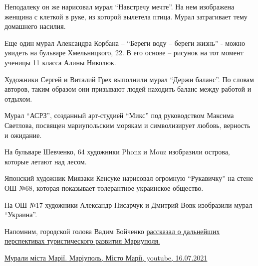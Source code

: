 
Неподалеку он же нарисовал мурал \enquote{Навстречу мечте}. На нем изображена женщина с
клеткой в руке, из которой вылетела птица. Мурал затрагивает тему домашнего
насилия.


Еще один мурал Александра Корбана – \enquote{Береги воду – береги жизнь} - можно
увидеть на бульваре Хмельницкого, 22. В его основе – рисунок на тот момент
ученицы 11 класса Алины Николюк.

Художники Сергей и Виталий Грех выполнили мурал \enquote{Держи баланс}. По словам
авторов, таким образом они призывают людей находить баланс между работой и
отдыхом.


Мурал \enquote{АСРЗ}, созданный арт-студией \enquote{Микс} под руководством Максима Светлова,
посвящен мариупольским морякам и символизирует любовь, верность и ожидание. 


На бульваре Шевченко, 64 художники Phonz и Mouz изобразили острова, которые летают над лесом.


Японский художник Миязаки Кенсуке нарисовал огромную \enquote{Рукавичку} на стене ОШ
№68, которая показывает толерантное украинское общество. 


На ОШ №17 художники Александр Писарчук и Дмитрий Вовк изобразили мурал \enquote{Украина}.


Напомним, городской голова Вадим Бойченко \href{https://mrpl.city/news/view/v-razvitii-turizma-mariupol-budet-ravnyatsya-na-gruziyu-i-frantsiyu}{рассказал о дальнейших перспективах туристического развития Мариуполя.}

\href{https://www.youtube.com/watch?v=TOPSGors-ew}{%
Мурали міста Марії. Маріуполь, Місто Марії, youtube, 16.07.2021%
}
